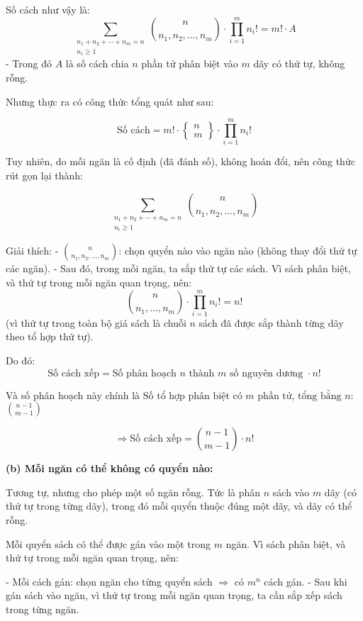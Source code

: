 \documentclass{article}
\begin{document}
	Số cách như vậy là:
	\[
	\sum_{\substack{n_1 + n_2 + \cdots + n_m = n \\ n_i \ge 1}} \binom{n}{n_1, n_2, \ldots, n_m} \cdot \prod_{i=1}^{m} n_i!
	= m! \cdot A
	\]
	- Trong đó $A$ là số cách chia $n$ phần tử phân biệt vào $m$ dãy có thứ tự, không rỗng.
	
	Nhưng thực ra có công thức tổng quát như sau:
	
	\[
	\text{Số cách} = m! \cdot \left\{ \begin{array}{c} n \\ m \end{array} \right\} \cdot \prod_{i=1}^{m} n_i!
	\]
	
	Tuy nhiên, do mỗi ngăn là cố định (đã đánh số), không hoán đổi, nên công thức rút gọn lại thành:
	
	\[
	\boxed{
		\sum_{\substack{n_1 + n_2 + \cdots + n_m = n \\ n_i \ge 1}} \binom{n}{n_1, n_2, \ldots, n_m}
	}
	\]
	
	Giải thích:
	- $\binom{n}{n_1, n_2, \ldots, n_m}$: chọn quyển nào vào ngăn nào (không thay đổi thứ tự các ngăn).
	- Sau đó, trong mỗi ngăn, ta sắp thứ tự các sách. Vì sách phân biệt, và thứ tự trong mỗi ngăn quan trọng, nên:
	\[
	\binom{n}{n_1, \ldots, n_m} \cdot \prod_{i=1}^m n_i! = n!
	\]
	(vì thứ tự trong toàn bộ giá sách là chuỗi $n$ sách đã được sắp thành từng dãy theo tổ hợp thứ tự).
	
	Do đó:
	\[
	\boxed{\text{Số cách xếp} = \text{Số phân hoạch } n \text{ thành } m \text{ số nguyên dương } \cdot n!}
	\]
	
	Và số phân hoạch này chính là $\displaystyle \text{Số tổ hợp phân biệt có } m \text{ phần tử, tổng bằng } n$: $\binom{n-1}{m-1}$
	
	\[
	\Rightarrow \boxed{\text{Số cách xếp} = \binom{n-1}{m-1} \cdot n!}
	\]
	
	\vspace{1em}
	\noindent\textbf{(b) Mỗi ngăn có thể không có quyển nào:}
	
	Tương tự, nhưng cho phép một số ngăn rỗng. Tức là phân $n$ sách vào $m$ dãy (có thứ tự trong từng dãy), trong đó mỗi quyển thuộc đúng một dãy, và dãy có thể rỗng.
	
	Mỗi quyển sách có thể được gán vào một trong $m$ ngăn. Vì sách phân biệt, và thứ tự trong mỗi ngăn quan trọng, nên:
	
	- Mỗi cách gán: chọn ngăn cho từng quyển sách $\Rightarrow$ có $m^n$ cách gán.
	- Sau khi gán sách vào ngăn, vì thứ tự trong mỗi ngăn quan trọng, ta cần sắp xếp sách trong từng ngăn.
	
\end{document}

